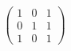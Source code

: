 \documentclass[10pt]{article}
\begin{document}
\begin{align*}\begin{pmatrix}
1 & 0 & 1\\
0 & 1 & 1\\
1 & 0 & 1  
\end{pmatrix}\end{align*}
\end{document}
